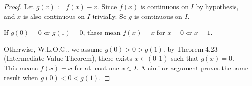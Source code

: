 \begin{Exercise}
\begin{proof}
Let $g(x) := f(x) - x$. Since $f(x)$ is continuous on $I$ by hypothesis, and $x$ is also continuous on $I$ trivially. So $g$ is continuous on $I$.

If $g(0) = 0$ or $g(1) = 0$, these mean $f(x) = x$ for $x=0$ or $x=1$. 

Otherwise, W.L.O.G., we assume $g(0) > 0 > g(1)$, by Theorem 4.23 (Intermediate Value Theorem), there exists $x\in (0,1)$ such that $g(x) = 0$. This means $f(x) = x$ for at least one $x\in I$. A similar argument proves the same result when $g(0) < 0 < g(1)$.
\end{proof}
\end{Exercise}